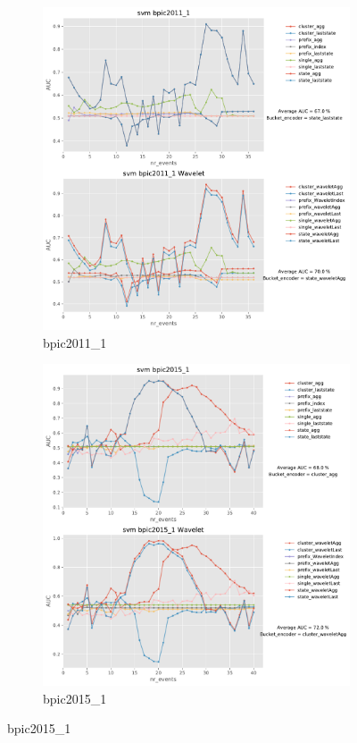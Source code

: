 \documentclass[twoside,11pt]{Latex/Classes/PhDthesisPSnPDF}
\begin{document}
\begin{figure}[!htbp] %

	\begin{subfigure}{0.48\textwidth}
		\includegraphics[width=\linewidth]{images/wavelet/graphs2svm/bpic2011_1.pdf}
		\caption{bpic2011\_1} 
	\end{subfigure}\hspace*{\fill}
	\begin{subfigure}{0.48\textwidth}
		\includegraphics[width=\linewidth]{images/wavelet/graphs2svm/bpic2015_1.pdf}
		\caption{bpic2015\_1}
	\end{subfigure}
	

\end{figure}
\end{document}
